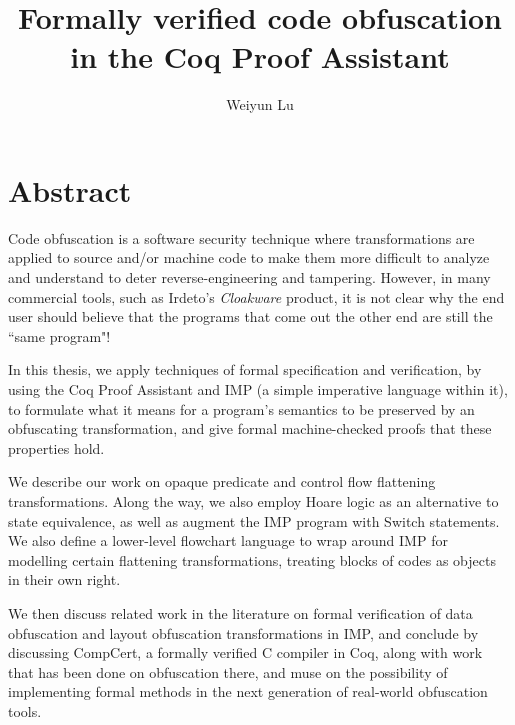 \documentclass[12pt,notitlepage]{report}
\theoremstyle{plain}
\theoremstyle{definition}
\numberwithin{equation}{section}
\begin{document}

\title{Formally verified code obfuscation in the Coq Proof Assistant}
\author{Weiyun Lu}
\copyrightfalse
   \tablespagefalse
\beforepreface
{}
\setcounter{chapter}{0}

\thispagestyle{empty}




\chapter*{Abstract}
\renewcommand{\thepage}{\roman{page}}
\setcounter{page}{2}
\renewcommand*\theenumi{\alph{enumi}}
\renewcommand*\labelenumi{(\theenumi)}
Code obfuscation is a software security technique where transformations are applied to source and/or machine code to make them more difficult to analyze and understand to deter reverse-engineering and tampering.  However, in many commercial tools, such as Irdeto's \emph{Cloakware} product, it is not clear why the end user should believe that the programs that come out the other end are still the ``same program"!
\par In this thesis, we apply techniques of formal specification and verification, by using the Coq Proof Assistant and IMP (a simple imperative language within it), to formulate what it means for a program's semantics to be preserved by an obfuscating transformation, and give formal machine-checked proofs that these properties hold.
\par We describe our work on opaque predicate and control flow flattening transformations.  Along the way, we also employ Hoare logic as an alternative to state equivalence, as well as augment the IMP program with Switch statements.  We also define a lower-level flowchart language to wrap around IMP for modelling certain flattening transformations, treating blocks of codes as objects in their own right.
\par We then discuss related work in the literature on formal verification of data obfuscation and layout obfuscation transformations in IMP, and conclude by discussing CompCert, a formally verified C compiler in Coq, along with work that has been done on obfuscation there, and muse on the possibility of implementing formal methods in the next generation of  real-world obfuscation tools.
\end{document}
